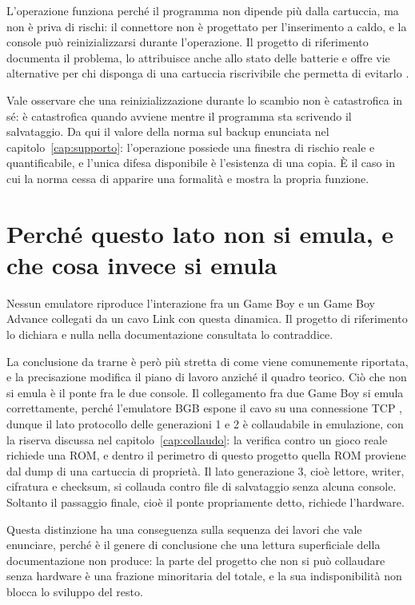 L'operazione funziona perché il programma non dipende più dalla cartuccia, ma non è priva di rischi: il connettore non è progettato per l'inserimento a caldo, e la console può reinizializzarsi durante l'operazione. Il progetto di riferimento documenta il problema, lo attribuisce anche allo stato delle batterie e offre vie alternative per chi disponga di una cartuccia riscrivibile che permetta di evitarlo \cite{ptgb}.

Vale osservare che una reinizializzazione durante lo scambio non è catastrofica in sé: è catastrofica quando avviene mentre il programma sta scrivendo il salvataggio. Da qui il valore della norma sul backup enunciata nel capitolo~\ref{cap:supporto}: l'operazione possiede una finestra di rischio reale e quantificabile, e l'unica difesa disponibile è l'esistenza di una copia. È il caso in cui la norma cessa di apparire una formalità e mostra la propria funzione.

\section{Perché questo lato non si emula, e che cosa invece si emula}

Nessun emulatore riproduce l'interazione fra un Game Boy e un Game Boy Advance collegati da un cavo Link con questa dinamica. Il progetto di riferimento lo dichiara e nulla nella documentazione consultata lo contraddice.

La conclusione da trarne è però più stretta di come viene comunemente riportata, e la precisazione modifica il piano di lavoro anziché il quadro teorico. Ciò che non si emula è il ponte fra le due console. Il collegamento fra due Game Boy si emula correttamente, perché l'emulatore BGB espone il cavo su una connessione TCP \cite{gambatte-gamelink,pokemongb-online}, dunque il lato protocollo delle generazioni 1 e 2 è collaudabile in emulazione, con la riserva discussa nel capitolo~\ref{cap:collaudo}: la verifica contro un gioco reale richiede una ROM, e dentro il perimetro di questo progetto quella ROM proviene dal dump di una cartuccia di proprietà. Il lato generazione 3, cioè lettore, writer, cifratura e checksum, si collauda contro file di salvataggio senza alcuna console. Soltanto il passaggio finale, cioè il ponte propriamente detto, richiede l'hardware.

Questa distinzione ha una conseguenza sulla sequenza dei lavori che vale enunciare, perché è il genere di conclusione che una lettura superficiale della documentazione non produce: la parte del progetto che non si può collaudare senza hardware è una frazione minoritaria del totale, e la sua indisponibilità non blocca lo sviluppo del resto.

